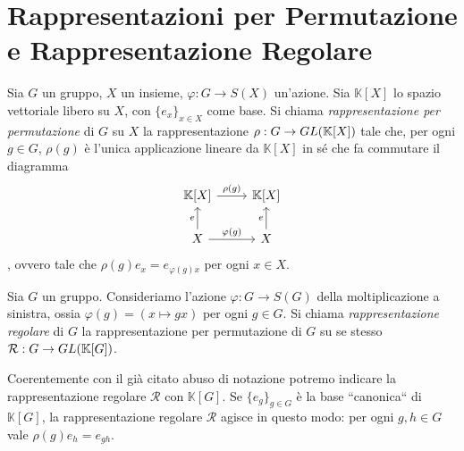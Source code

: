 \section{Rappresentazioni per Permutazione e Rappresentazione Regolare}

\begin{definition}
Sia $G$ un gruppo, $X$ un insieme, $\varphi:G\to S(X)$ un'azione. Sia $\mathbb{K}[X]$ lo spazio vettoriale libero su $X$, con $\{e_x\}_{x\in X}$ come base. Si chiama \emph{rappresentazione per permutazione} di $G$ su $X$ la rappresentazione $\rho:G\to GL(\mathbb{K}[X])$ tale che, per ogni $g\in G$, $\rho(g)$ è l'unica applicazione lineare da $\mathbb{K}[X]$ in sé che fa commutare il diagramma
$$
\begin{tikzcd}
\mathbb{K}[X]\arrow[r,"\rho(g)"]&\mathbb{K}[X]\\
X\arrow[u,"e"]\arrow[r,"\varphi(g)"]&X\arrow[u,"e"]
\end{tikzcd}
$$
, ovvero tale che $\rho(g)e_x=e_{\varphi(g)x}$ per ogni $x\in X$.
\end{definition}

\begin{definition}
Sia $G$ un gruppo. Consideriamo l'azione $\varphi:G\to S(G)$ della moltiplicazione a sinistra, ossia $\varphi(g)=(x\mapsto gx)$ per ogni $g\in G$. Si chiama \emph{rappresentazione regolare} di $G$ la rappresentazione per permutazione di $G$ su se stesso $\mathcal{R}:G\to GL(\mathbb{K}[G])$.
\end{definition}

Coerentemente con il già citato abuso di notazione potremo indicare la rappresentazione regolare $\mathcal{R}$ con $\mathbb{K}[G]$. Se $\{e_g\}_{g\in G}$ è la base ``canonica`` di $\mathbb{K}[G]$, la rappresentazione regolare $\mathcal{R}$ agisce in questo modo: per ogni $g,h\in G$ vale $\rho(g)e_h=e_{gh}$.


